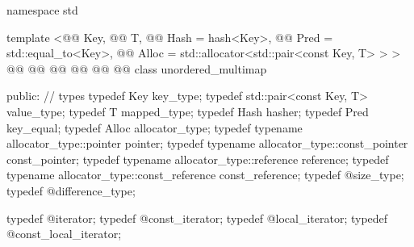 \documentclass[american,twoside]{book}
\begin{document}
%
\begin{codeblock}
namespace std {
  template <@@ Key,
            @@ T,
            @@ Hash = hash<Key>,
            @@ Pred = std::equal_to<Key>,
            @@ Alloc = std::allocator<std::pair<const Key, T> > >
  @@
           @@
           @@
           @@
           @@
           @@
  class unordered_multimap
  {
  public:
    // types
    typedef Key                                      key_type;
    typedef std::pair<const Key, T>                  value_type;
    typedef T                                        mapped_type;
    typedef Hash                                     hasher;
    typedef Pred                                     key_equal;
    typedef Alloc                                    allocator_type;
    typedef typename allocator_type::pointer         pointer;
    typedef typename allocator_type::const_pointer   const_pointer;
    typedef typename allocator_type::reference       reference;
    typedef typename allocator_type::const_reference const_reference;
    typedef @\impdef@                   size_type;
    typedef @\impdef@                   difference_type;

    typedef @\impdef@                   iterator;
    typedef @\impdef@                   const_iterator;
    typedef @\impdef@                   local_iterator;
    typedef @\impdef@                   const_local_iterator;

}}
\end{codeblock}
\end{document}
